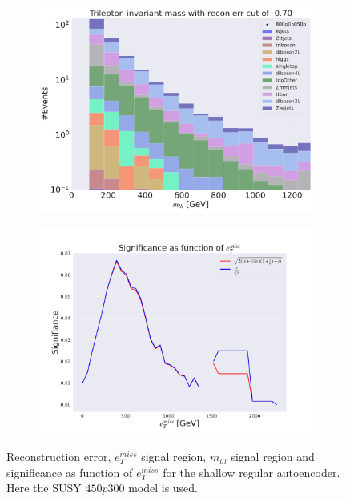 \begin{figure}[H]
    \hfill
    \begin{subfigure}{.40\textwidth}
        \includegraphics[width=\textwidth]{Figures/AE_testing/small/3lep/b_data_recon_big_rm3_feats_sig_800p0p050p_mlll_recon_errcut_-0.70.pdf}
        \caption{}
        \label{fig:AE_3lep_small_mlll_800_3}
    \end{subfigure}
    \hfill   
    \begin{subfigure}{.40\textwidth}
        \includegraphics[width=\textwidth]{Figures/AE_testing/small/3lep/significance_etmiss_800p0p050p_-0.7044693201264449.pdf}
        \caption{}
        \label{fig:AE_3lep_small_signi_800_3}
    \end{subfigure}
    \hfill      
    \caption[3lep shallow network | $800p50$ | AE | 3]{Reconstruction error, $e_T^{miss}$ signal region, $m_{lll}$ signal region and significance as function of 
    $e_T^{miss}$ for the shallow regular autoencoder. Here the SUSY $450p300$ model is used.}
    \label{fig:AE_3lep_small_rec_sig_signi_800_3}
\end{figure}


